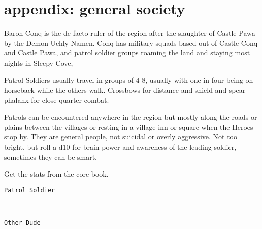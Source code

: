 \section*{appendix: general society}

\raggedbottom

Baron Conq is the de facto ruler of the region after the slaughter of Castle Pawa by the Demon Uchly Namen. Conq has military squads based out of Castle Conq and Castle Pawa, and patrol soldier groups roaming the land and staying most nights in Sleepy Cove,

Patrol Soldiers usually travel in groups of 4-8, usually with one in four being on horseback while the others walk. Crossbows for distance and shield and spear phalanx for close quarter combat.

Patrols can be encountered anywhere in the region but mostly along the roads or plains between the villages or resting in a village inn or square when the Heroes stop by. They are general people, not suicidal or overly aggressive. Not too bright, but roll a d10 for brain power and awareness of the leading soldier, sometimes they can be smart.

Get the stats from the core book.

\goodbreak \small \begin{samepage} \begin{verbatim}
Patrol Soldier
\end{verbatim} \end{samepage} \normalsize

\

\goodbreak \small \begin{samepage} \begin{verbatim}
Other Dude
\end{verbatim} \end{samepage} \normalsize

\flushbottom


































































